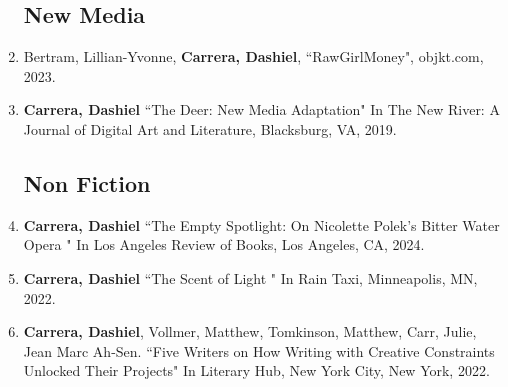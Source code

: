 \begin{enumerate}
\subsection{New Media}
\item Bertram, Lillian-Yvonne, \textbf{Carrera, Dashiel}, ``RawGirlMoney", objkt.com, 2023.
\item \textbf{Carrera, Dashiel} ``The Deer: New Media Adaptation" In The New River: A Journal of Digital Art and Literature, Blacksburg, VA, 2019.\\

\subsection{Non Fiction}

\item \textbf{Carrera, Dashiel} ``The Empty Spotlight: On Nicolette Polek's Bitter Water Opera " In Los Angeles Review of Books, Los Angeles, CA, 2024.\\
\item \textbf{Carrera, Dashiel} ``The Scent of Light " In Rain Taxi, Minneapolis, MN, 2022.\\
%
\item \textbf{Carrera, Dashiel}, Vollmer, Matthew, Tomkinson, Matthew, Carr, Julie, Jean Marc Ah-Sen. ``Five Writers on How Writing with Creative Constraints Unlocked Their Projects" In Literary Hub, New York City, New York, 2022.\\





\end{enumerate}
